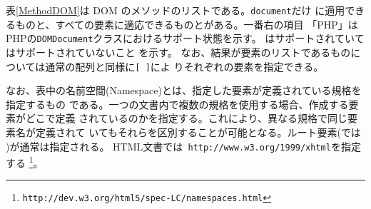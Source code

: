 表\ref{MethodDOM}は DOM のメソッドのリストである。\texttt{document}だけ
に適用できるものと、すべての要素に適応できるものとがある。一番右の項目
「PHP」はPHPの\texttt{DOMDocument}クラスにおけるサポート状態を示す。
\Yes はサポートされていて\No はサポートされていないこと
を示す。
なお、結果が要素のリストであるものについては通常の配列と同様に\texttt{[ ]}によ
りそれぞれの要素を指定できる。

なお、表中の名前空間(Namespace)とは、指定した要素が定義されている規格を指定するもの
である。一つの文書内で複数の規格を使用する場合、作成する要素がどこで定義
されているのかを指定する。これにより、異なる規格で同じ要素名が定義されて
いてもそれらを区別することが可能となる。ルート要素(\HTML では
)が通常は指定される。
HTML文書では\texttt{ http://www.w3.org/1999/xhtml}を指定する
\footnote{\texttt{http://dev.w3.org/html5/spec-LC/namespaces.html}}。
\newpage
